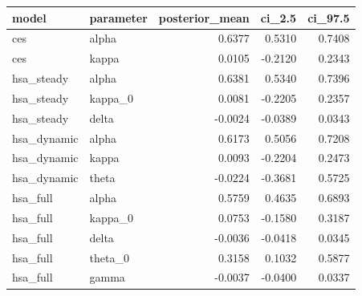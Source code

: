 \begin{tabular}{llrrr}
\toprule
model & parameter & posterior\_mean & ci\_2.5 & ci\_97.5 \\
\midrule
ces & alpha & 0.6377 & 0.5310 & 0.7408 \\
ces & kappa & 0.0105 & -0.2120 & 0.2343 \\
hsa\_steady & alpha & 0.6381 & 0.5340 & 0.7396 \\
hsa\_steady & kappa\_0 & 0.0081 & -0.2205 & 0.2357 \\
hsa\_steady & delta & -0.0024 & -0.0389 & 0.0343 \\
hsa\_dynamic & alpha & 0.6173 & 0.5056 & 0.7208 \\
hsa\_dynamic & kappa & 0.0093 & -0.2204 & 0.2473 \\
hsa\_dynamic & theta & -0.0224 & -0.3681 & 0.5725 \\
hsa\_full & alpha & 0.5759 & 0.4635 & 0.6893 \\
hsa\_full & kappa\_0 & 0.0753 & -0.1580 & 0.3187 \\
hsa\_full & delta & -0.0036 & -0.0418 & 0.0345 \\
hsa\_full & theta\_0 & 0.3158 & 0.1032 & 0.5877 \\
hsa\_full & gamma & -0.0037 & -0.0400 & 0.0337 \\
\bottomrule
\end{tabular}
